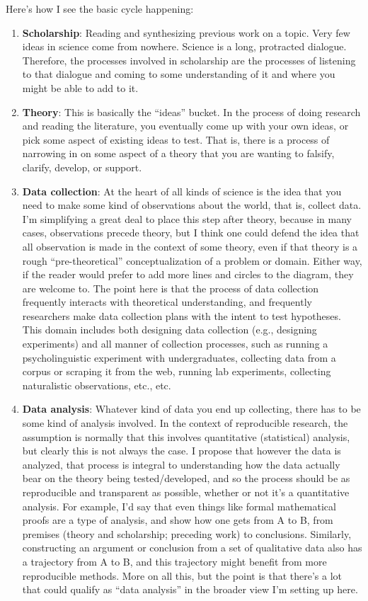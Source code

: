 \documentclass{book}
\begin{document}
\noindent Here's how I see the basic cycle happening:

\begin{enumerate}
\item \textbf{Scholarship}: Reading and synthesizing previous work on a topic. Very few ideas in science come from nowhere.  Science is a long, protracted dialogue.  Therefore, the processes involved in scholarship are the processes of listening to that dialogue and coming to some understanding of it and where you might be able to add to it.
\item \textbf{Theory}: This is basically the ``ideas'' bucket. In the process of doing research and reading the literature, you eventually come up with your own ideas, or pick some aspect of existing ideas to test. That is, there is a process of narrowing in on some aspect of a theory that you are wanting to falsify, clarify, develop, or support.
\item \textbf{Data collection}: At the heart of all kinds of science is the idea that you need to make some kind of observations about the world, that is, collect data. I'm simplifying a great deal to place this step after theory, because in many cases, observations precede theory, but I think one could defend the idea that all observation is made in the context of some theory, even if that theory is a rough ``pre-theoretical'' conceptualization of a problem or domain.  Either way, if the reader would prefer to add more lines and circles to the diagram, they are welcome to. The point here is that the process of data collection frequently interacts with theoretical understanding, and frequently researchers make data collection plans with the intent to test hypotheses.  This domain includes both designing data collection (e.g., designing experiments) and all manner of collection processes, such as running a psycholinguistic experiment with undergraduates, collecting data from a corpus or scraping it from the web, running lab experiments, collecting naturalistic observations, etc., etc.
\item \textbf{Data analysis}: Whatever kind of data you end up collecting, there has to be some kind of analysis involved. In the context of reproducible research, the assumption is normally that this involves quantitative (statistical) analysis, but clearly this is not always the case. I propose that however the data is analyzed, that process is integral to understanding how the data actually bear on the theory being tested/developed, and so the process should be as reproducible and transparent as possible, whether or not it's a quantitative analysis. For example, I'd say that even things like formal mathematical proofs are a type of analysis, and show how one gets from A to B, from premises (theory and scholarship; preceding work) to conclusions. Similarly, constructing an argument or conclusion from a set of qualitative data also has a trajectory from A to B, and this trajectory might benefit from more reproducible methods. More on all this, but the point is that there's a lot that could qualify as ``data analysis'' in the broader view I'm setting up here.

\end{enumerate}
\end{document}
